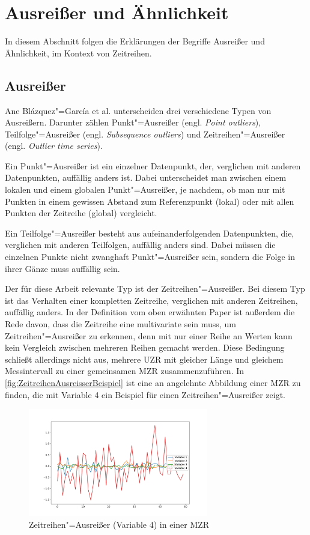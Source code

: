 \section{Ausreißer und Ähnlichkeit}
In diesem Abschnitt folgen die Erklärungen der Begriffe Ausreißer und Ähnlichkeit, im Kontext von Zeitreihen.
\subsection{Ausreißer}
Ane Blázquez"=García et al. \cite[Ch. 2.2]{reviewOutlierDetection} unterscheiden drei verschiedene Typen von Ausreißern. Darunter zählen Punkt"=Ausreißer (engl. \textit{Point outliers}), Teilfolge"=Ausreißer (engl. \textit{Subsequence outliers}) und Zeitreihen"=Ausreißer (engl. \textit{Outlier time series}).

Ein Punkt"=Ausreißer ist ein einzelner Datenpunkt, der, verglichen mit anderen Datenpunkten, auffällig anders ist. Dabei unterscheidet man zwischen einem lokalen und einem globalen Punkt"=Ausreißer, je nachdem, ob man nur mit Punkten in einem gewissen Abstand zum Referenzpunkt (lokal) oder mit allen Punkten der Zeitreihe (global) vergleicht.

Ein Teilfolge"=Ausreißer besteht aus aufeinanderfolgenden Datenpunkten, die, verglichen mit anderen Teilfolgen, auffällig anders sind. Dabei müssen die einzelnen Punkte nicht zwanghaft Punkt"=Ausreißer sein, sondern die Folge in ihrer Gänze muss auffällig sein. 

Der für diese Arbeit relevante Typ ist der Zeitreihen"=Ausreißer. Bei diesem Typ ist das Verhalten einer kompletten Zeitreihe, verglichen mit anderen Zeitreihen, auffällig anders. In der Definition vom oben erwähnten Paper \cite{reviewOutlierDetection} ist außerdem die Rede davon, dass die Zeitreihe eine multivariate sein muss, um Zeitreihen"=Ausreißer zu erkennen, denn mit nur einer Reihe an Werten kann kein Vergleich zwischen mehreren Reihen gemacht werden. Diese Bedingung schließt allerdings nicht aus, mehrere \acs{UZR} mit gleicher Länge und gleichem Messintervall zu einer gemeinsamen \acs{MZR} zusammenzuführen. In \autoref{fig:ZeitreihenAusreisserBeispiel} ist eine an \cite[Fig. 5]{reviewOutlierDetection} angelehnte Abbildung einer \acs{MZR} zu finden, die mit Variable 4 ein Beispiel für einen Zeitreihen"=Ausreißer zeigt.
\begin{figure}[bth] 
  \centering
  \includegraphics[width=0.7\textwidth]{Graphics/TimeSeriesOutlierExample.pdf}
  \caption{Zeitreihen"=Ausreißer (Variable 4) in einer \acs{MZR}}
  \label{fig:ZeitreihenAusreisserBeispiel}
\end{figure}

